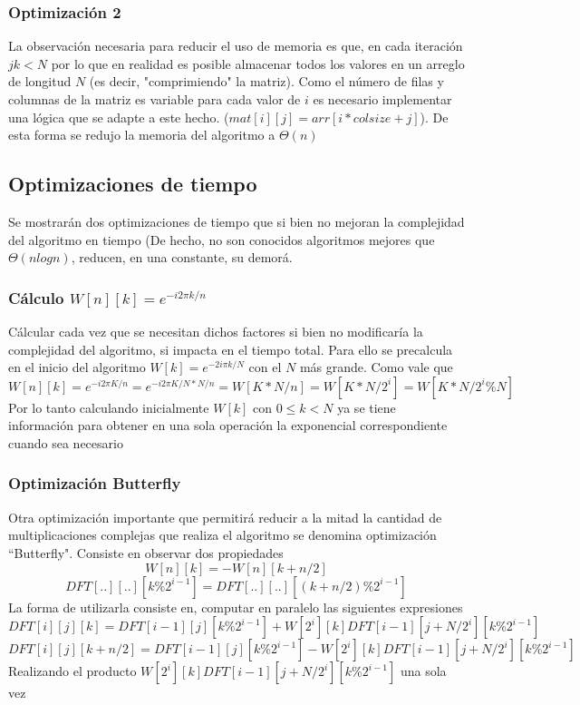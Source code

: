 \documentclass[assd_tp2_main.tex]{subfiles}
\begin{document}
\subsubsection{Optimización 2}
La observación necesaria para reducir el uso de memoria es que, en cada iteración $jk<N$ por lo que en realidad es posible almacenar todos los valores en un arreglo de longitud $N$ (es decir, "comprimiendo" la matriz). Como el número de filas y columnas de la matriz es variable para cada valor de $i$ es necesario implementar una lógica que se adapte a este hecho. ($mat[i][j]=arr[i*colsize+j]$).
De esta forma se redujo la memoria del algoritmo a $\Theta(n)$

\subsection{Optimizaciones de tiempo}
Se mostrarán dos optimizaciones de tiempo que si bien no mejoran la complejidad del algoritmo en tiempo (De hecho, no son conocidos algoritmos mejores que $\Theta(nlogn)$, reducen, en una constante, su demorá.
\subsubsection{Cálculo $W[n][k]=e^{-i2\pi k/n}$}
Cálcular cada vez que se necesitan dichos factores si bien no modificaría la complejidad del algoritmo, si impacta en el tiempo total.
Para ello se precalcula en el inicio del algoritmo $W[k]=e^{-2i\pi k/N}$ con el $N$ más grande. Como vale que
\begin{equation}
W[n][k]=e^{-i2\pi K/n}=e^{-i2\pi K/N*N/n}=W[K*N/n]=W[K*N/2^{i}]=W[K*N/2^{i}\%N]
\end{equation}
Por lo tanto calculando inicialmente $W[k]$ con $0\leq k <N$ ya se tiene información para obtener en una sola operación la exponencial correspondiente cuando sea necesario

\subsubsection{Optimización Butterfly}
Otra optimización importante que permitirá reducir a la mitad la cantidad de multiplicaciones complejas que realiza el algoritmo se denomina optimización ``Butterfly". Consiste en observar dos propiedades
\begin{equation}
W[n][k]=-W[n][k+n/2]
\end{equation}
\begin{equation}
DFT[..][..][k\%2^{i-1}]=DFT[..][..][(k+n/2)\%2^{i-1}]
\end{equation}
La forma de utilizarla consiste en, computar en paralelo las siguientes expresiones
\begin{equation}
DFT[i][j][k] = DFT[i-1][j][k\%2^{i-1}] + W[2^i][k] DFT[i-1][j+N/2^{i}][k\%2^{i-1}] 
\end{equation}
\begin{equation}
DFT[i][j][k+n/2] = DFT[i-1][j][k\%2^{i-1}] - W[2^i][k] DFT[i-1][j+N/2^{i}][k\%2^{i-1}]
\end{equation}
Realizando el producto $W[2^i][k] DFT[i-1][j+N/2^{i}][k\%2^{i-1}]$ una sola vez
\end{document}
